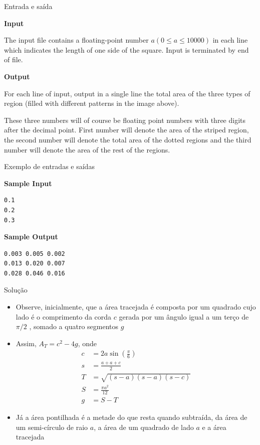 \begin{frame}[fragile]{Entrada e saída}

\textbf{Input}

The input file contains a floating-point number
$a (0 \leq a \leq 10000)$ in each line which indicates
the length of one side of the square. Input is
terminated by end of file.

\textbf{Output}

For each line of input, output in a single line
the total area of the three types of region (filled with different patterns in the image above).

These three numbers will of course be floating point numbers with three digits after the decimal
point. First number will denote the area of the striped region, the second number will denote the total
area of the dotted regions and the third number will denote the area of the rest of the regions.
\end{frame}

\begin{frame}[fragile]{Exemplo de entradas e saídas}

\begin{minipage}[t]{0.5\textwidth}
\textbf{Sample Input}
\begin{verbatim}
0.1
0.2
0.3
\end{verbatim}
\end{minipage}
\begin{minipage}[t]{0.45\textwidth}
\textbf{Sample Output}
\begin{verbatim}
0.003 0.005 0.002
0.013 0.020 0.007
0.028 0.046 0.016
\end{verbatim}
\end{minipage}
\end{frame}

\begin{frame}[fragile]{Solução}

    \begin{itemize}
        \item Observe, inicialmente, que a área tracejada é composta por um quadrado cujo lado 
            é o comprimento da corda $c$ gerada por um ângulo igual a um terço de $\pi/2$ , somado 
            a quatro segmentos $g$

        \item Assim, $A_T = c^2 - 4g$, onde
        \begin{align*}
            c &= 2a\sin\left(\frac{\pi}{6}\right) \\
            s &= \frac{a + a + c}{2} \\
            T &= \sqrt{(s - a)(s - a)(s - c)} \\
            S &= \frac{\pi a^2}{12}  \\
            g &= S - T
        \end{align*}

        \item Já a área pontilhada é a metade do que resta quando subtraída, da área de um 
            semi-círculo de raio $a$, a área de um quadrado de lado $a$ e a área tracejada
    \end{itemize}

\end{frame}


